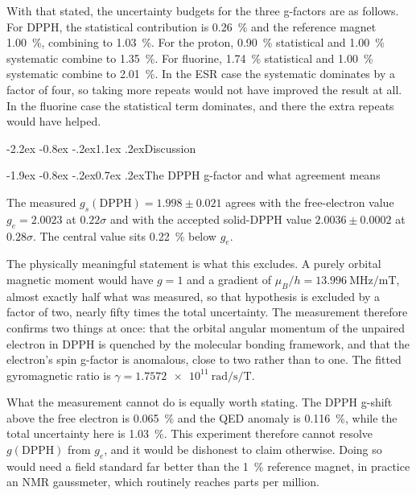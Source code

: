 \documentclass[11pt,a4paper]{article}
\makeatletter
\renewcommand\section{\@startsection{section}{1}{\z@}%
  {-2.2ex \@plus -0.8ex \@minus -.2ex}{1.1ex \@plus .2ex}{\normalfont\large\bfseries}}
\renewcommand\subsection{\@startsection{subsection}{2}{\z@}%
  {-1.9ex \@plus -0.8ex \@minus -.2ex}{0.7ex \@plus .2ex}{\normalfont\normalsize\bfseries}}
\makeatother
\begin{document}
With that stated, the uncertainty budgets for the three g-factors are as follows. For DPPH, the
statistical contribution is \SI{0.26}{\percent} and the reference magnet \SI{1.00}{\percent},
combining to \SI{1.03}{\percent}. For the proton, \SI{0.90}{\percent} statistical and
\SI{1.00}{\percent} systematic combine to \SI{1.35}{\percent}. For fluorine,
\SI{1.74}{\percent} statistical and \SI{1.00}{\percent} systematic combine to
\SI{2.01}{\percent}. In the ESR case the systematic dominates by a factor of four, so taking more
repeats would not have improved the result at all. In the fluorine case the statistical term
dominates, and there the extra repeats would have helped.

\section{Discussion}
\label{sec:disc}

\subsection{The DPPH g-factor and what agreement means}

The measured $g_s(\mathrm{DPPH}) = 1.998 \pm 0.021$ agrees with the free-electron value
$g_e = 2.0023$ at $0.22\sigma$ and with the accepted solid-DPPH value $2.0036 \pm 0.0002$ at
$0.28\sigma$. The central value sits \SI{0.22}{\percent} below $g_e$.

The physically meaningful statement is what this excludes. A purely orbital magnetic moment would
have $g = 1$ and a gradient of $\mu_B/h = \SI{13.996}{\mega\hertz\per\milli\tesla}$, almost
exactly half what was
measured, so that hypothesis is excluded by a factor of two, nearly fifty times the total
uncertainty. The measurement therefore confirms two things at once: that the orbital angular
momentum of the unpaired electron in DPPH is quenched by the molecular bonding framework, and that
the electron's spin g-factor is anomalous, close to two rather than to one. The fitted gyromagnetic
ratio is $\gamma = \SI{1.7572e11}{\radian\per\second\per\tesla}$.

What the measurement cannot do is equally worth stating. The DPPH g-shift above the free electron
is \SI{0.065}{\percent} and the QED anomaly is \SI{0.116}{\percent}, while the total uncertainty
here is \SI{1.03}{\percent}. This experiment therefore cannot resolve $g(\mathrm{DPPH})$ from
$g_e$, and it would be dishonest to claim otherwise. Doing so would need a field standard far
better than the \SI{1}{\percent} reference magnet, in practice an NMR gaussmeter, which routinely
reaches parts per million.
\end{document}
